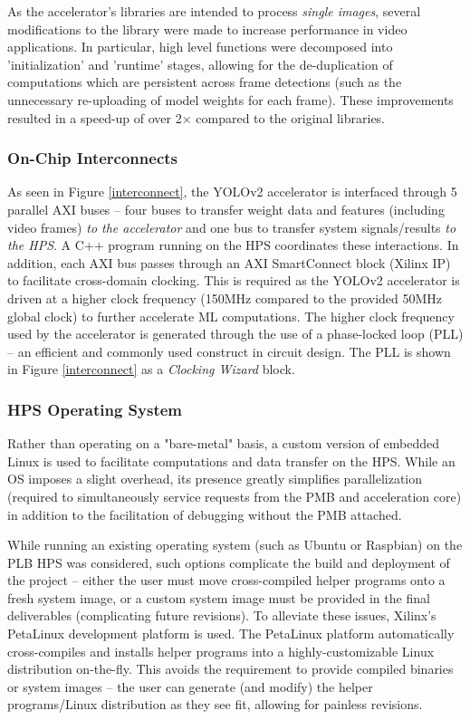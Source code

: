 As the accelerator's libraries are intended to process \textit{single images}, several modifications to the library were made to increase performance in video applications. In particular, high level functions were decomposed into 'initialization' and 'runtime' stages, allowing for the de-duplication of computations which are persistent across frame detections (such as the unnecessary re-uploading of model weights for each frame). These improvements resulted in a speed-up of over 2$\times$ compared to the original libraries.

\subsubsection{On-Chip Interconnects}
As seen in Figure \ref{interconnect}, the YOLOv2 accelerator is interfaced through 5 parallel AXI buses -- four buses to transfer weight data and features (including video frames) \textit{to the accelerator} and one bus to transfer system signals/results \textit{to the HPS}. A C++ program running on the HPS coordinates these interactions. In addition, each AXI bus passes through an AXI SmartConnect block (Xilinx IP) to facilitate cross-domain clocking. This is required as the YOLOv2 accelerator is driven at a higher clock frequency (150MHz compared to the provided 50MHz global clock) to further accelerate ML computations. The higher clock frequency used by the accelerator is generated through the use of a phase-locked loop (PLL) -- an efficient and commonly used construct in circuit design. The PLL is shown in Figure \ref{interconnect} as a \textit{Clocking Wizard} block.

\subsubsection{HPS Operating System}
Rather than operating on a "bare-metal" basis, a custom version of embedded Linux is used to facilitate computations and data transfer on the HPS. While an OS imposes a slight overhead, its presence greatly simplifies parallelization (required to simultaneously service requests from the PMB and acceleration core) in addition to the facilitation of debugging without the PMB attached. 

While running an existing operating system (such as Ubuntu or Raspbian) on the PLB HPS was considered, such options complicate the build and deployment of the project -- either the user must move cross-compiled helper programs onto a fresh system image, or a custom system image must be provided in the final deliverables (complicating future revisions). To alleviate these issues, Xilinx's PetaLinux development platform\cite{petalinux} is used. The PetaLinux platform automatically cross-compiles and installs helper programs into a highly-customizable Linux distribution on-the-fly. This avoids the requirement to provide compiled binaries or system images -- the user can generate (and modify) the helper programs/Linux distribution as they see fit, allowing for painless revisions.
